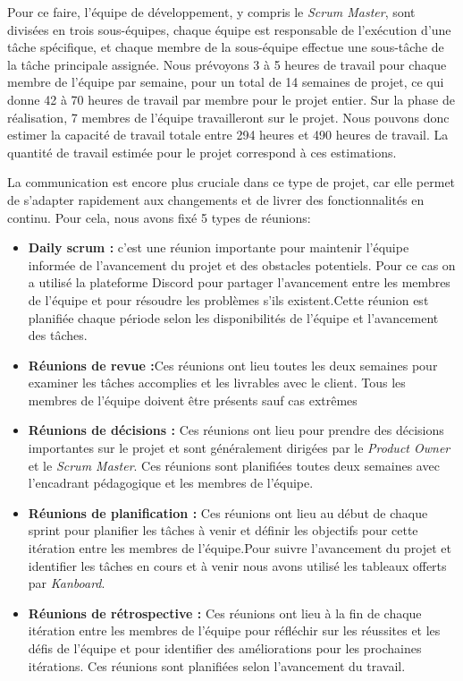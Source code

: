 \documentclass{article}
\begin{document}
Pour ce faire, l'équipe de développement, y compris le \textit{Scrum Master}, sont divisées en trois sous-équipes, chaque équipe est responsable de l'exécution d'une tâche spécifique, et chaque membre de la sous-équipe effectue une sous-tâche de la tâche principale assignée.
Nous prévoyons 3 à 5 heures de travail pour chaque membre de l'équipe par semaine, pour un total de 14 semaines de projet, ce qui donne 42 à 70 heures de travail par membre pour le projet entier. Sur la phase de réalisation,
7 membres de l'équipe travailleront sur le projet. Nous pouvons donc estimer la capacité de travail totale entre 294 heures et 490 heures de travail. La quantité de travail estimée pour le projet correspond à ces estimations.

La communication est encore plus cruciale dans ce type de projet, car elle permet de s'adapter rapidement aux changements et de livrer des fonctionnalités en continu. 
Pour cela, nous avons fixé 5 types de réunions:

\begin{itemize}

    \item \textbf{Daily scrum :} c’est une réunion importante pour maintenir l'équipe informée de l'avancement du projet et des obstacles potentiels. Pour ce cas on a utilisé la plateforme Discord pour partager l’avancement entre les membres de l’équipe et pour résoudre les problèmes s’ils existent.Cette réunion est planifiée chaque période selon les disponibilités de l’équipe et l’avancement des tâches.
    \item \textbf{Réunions de revue :}Ces réunions ont lieu toutes les deux semaines pour examiner les tâches accomplies et les livrables avec le client. Tous les membres de l’équipe doivent être présents sauf cas extrêmes
    \item \textbf{Réunions de décisions :} Ces réunions ont lieu pour prendre des décisions importantes sur le projet et sont généralement dirigées par le \textit{Product Owner} et le \textit{Scrum Master}. Ces réunions sont planifiées toutes deux semaines avec l’encadrant pédagogique et les membres de l'équipe.
    \item \textbf{Réunions de planification :} Ces réunions ont lieu au début de chaque sprint pour planifier les tâches à venir et définir les objectifs pour cette itération entre les membres de l’équipe.Pour suivre l'avancement du projet et identifier les tâches en cours et à venir nous avons utilisé les tableaux offerts par \textit{Kanboard}.
    \item \textbf{Réunions de rétrospective :} Ces réunions ont lieu à la fin de chaque itération entre les membres de l’équipe pour réfléchir sur les réussites et les défis de l'équipe et pour identifier des améliorations pour les prochaines itérations. Ces réunions sont planifiées selon l’avancement du travail.

\end{itemize}
\end{document}
